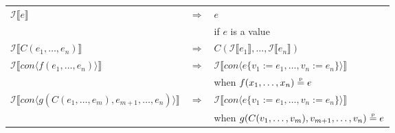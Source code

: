 \begin{tabular}{l l l}
$\mathcal{I} \llbracket e \rrbracket$ &
$\Rightarrow$ &
$e$ \\ & & if $e$ is a value\\

$\mathcal{I} \llbracket C(e_1, \ldots, e_n) \rrbracket$ &
$\Rightarrow$ &
$C(\mathcal{I} \llbracket e_1 \rrbracket, \ldots, \mathcal{I} \llbracket e_n \rrbracket)$ \\

$\mathcal{I} \llbracket con \langle f(e_1, \ldots, e_n) \rangle \rrbracket$ &
$\Rightarrow$ &
$\mathcal{I} \llbracket con \langle e \{v_1 := e_1, \ldots, v_n := e_n\} \rangle \rrbracket$ \\
& & when $f(x_1, \ldots, x_n) \stackrel{\textrm{\tiny p}}{=} e$\\

$\mathcal{I} \llbracket con \langle g(C(e_1, \ldots, e_m), e_{m+1},\ldots, e_n)\rangle \rrbracket$ &
$\Rightarrow$ &
$\mathcal{I} \llbracket con \langle e \{v_1 := e_1, \ldots, v_n := e_n\} \rangle \rrbracket$ \\
& & when $g(C(v_1, \ldots, v_m), v_{m+1},\ldots, v_n) \stackrel{\textrm{\tiny p}}{=} e$ 
\end{tabular}